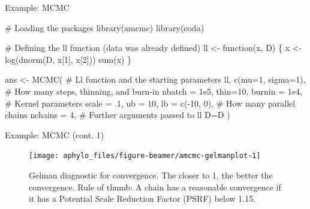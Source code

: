 \documentclass[9pt,handout,ignorenonframetext,]{beamer}
\newenvironment{Shaded}{\begin{snugshade}}{\end{snugshade}}
\newcommand{\KeywordTok}[1]{\textcolor[rgb]{0.94,0.87,0.69}{#1}}
\newcommand{\DataTypeTok}[1]{\textcolor[rgb]{0.87,0.87,0.75}{#1}}
\newcommand{\DecValTok}[1]{\textcolor[rgb]{0.86,0.86,0.80}{#1}}
\newcommand{\FloatTok}[1]{\textcolor[rgb]{0.75,0.75,0.82}{#1}}
\newcommand{\StringTok}[1]{\textcolor[rgb]{0.80,0.58,0.58}{#1}}
\newcommand{\CommentTok}[1]{\textcolor[rgb]{0.50,0.62,0.50}{#1}}
\newcommand{\ControlFlowTok}[1]{\textcolor[rgb]{0.94,0.87,0.69}{#1}}
\newcommand{\OperatorTok}[1]{\textcolor[rgb]{0.94,0.94,0.82}{#1}}
\newcommand{\NormalTok}[1]{\textcolor[rgb]{0.80,0.80,0.80}{#1}}
\begin{document}
\begin{frame}[fragile,t]{Example: MCMC}

\footnotesize

\normalsize

\footnotesize

\begin{Shaded}
\begin{Highlighting}[]
\CommentTok{# Loading the packages}
\KeywordTok{library}\NormalTok{(amcmc)}
\KeywordTok{library}\NormalTok{(coda)}

\CommentTok{# Defining the ll function (data was already defined)}
\NormalTok{ll <-}\StringTok{ }\ControlFlowTok{function}\NormalTok{(x, D) \{}
\NormalTok{  x <-}\StringTok{ }\KeywordTok{log}\NormalTok{(}\KeywordTok{dnorm}\NormalTok{(D, x[}\DecValTok{1}\NormalTok{], x[}\DecValTok{2}\NormalTok{]))}
  \KeywordTok{sum}\NormalTok{(x)}
\NormalTok{\}}

\NormalTok{ans <-}\StringTok{ }\KeywordTok{MCMC}\NormalTok{(}
  \CommentTok{# Ll function and the starting parameters}
\NormalTok{  ll, }\KeywordTok{c}\NormalTok{(}\DataTypeTok{mu=}\DecValTok{1}\NormalTok{, }\DataTypeTok{sigma=}\DecValTok{1}\NormalTok{),}
  \CommentTok{# How many steps, thinning, and burn-in}
  \DataTypeTok{nbatch =} \FloatTok{1e5}\NormalTok{, }\DataTypeTok{thin=}\DecValTok{10}\NormalTok{, }\DataTypeTok{burnin =} \FloatTok{1e4}\NormalTok{,}
  \CommentTok{# Kernel parameters}
  \DataTypeTok{scale =}\NormalTok{ .}\DecValTok{1}\NormalTok{, }\DataTypeTok{ub =} \DecValTok{10}\NormalTok{, }\DataTypeTok{lb =} \KeywordTok{c}\NormalTok{(}\OperatorTok{-}\DecValTok{10}\NormalTok{, }\DecValTok{0}\NormalTok{),}
  \CommentTok{# How many parallel chains}
  \DataTypeTok{nchains =} \DecValTok{4}\NormalTok{,}
  \CommentTok{# Further arguments passed to ll}
  \DataTypeTok{D=}\NormalTok{D}
\NormalTok{  )}
\end{Highlighting}
\end{Shaded}

\normalsize

\end{frame}

\begin{frame}[t]{Example: MCMC (cont. 1)}

\footnotesize

\begin{figure}

{\centering \texttt{[image: aphylo\_files/figure-beamer/amcmc-gelmanplot-1]} 

}

\caption{Gelman diagnostic for convergence. The closer to 1, the better the convergence. Rule of thumb: A chain has a reasonable convergence if it has a Potential Scale Reduction Factor (PSRF) below 1.15.}\label{fig:amcmc-gelmanplot}
\end{figure}

\normalsize

\end{frame}
\end{document}
